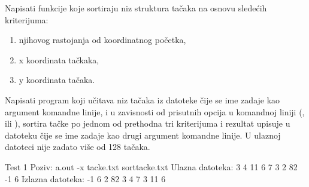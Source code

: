 \begin{Exercise}[label=507]
  Napisati funkcije koje sortiraju niz struktura tačaka na
  osnovu sledećih kriterijuma:
\begin{enumerate}
\item njihovog rastojanja od koordinatnog početka,
\item x koordinata tačkaka,
\item y koordinata tačaka.
\end{enumerate}
Napisati program koji učitava niz tačaka iz datoteke čije se ime
zadaje kao argument komandne linije, i u zavisnosti od prisutnih
opcija u komandnoj liniji (,  ili ),
sortira tačke po jednom od prethodna tri kriterijuma i rezultat
upisuje u datoteku čije se ime zadaje kao drugi argument komandne
linije. U ulaznoj datoteci nije zadato više od 128 tačaka.
  
\begin{miditest}
\begin{test}{Test 1}
Poziv:  a.out -x tacke.txt sorttacke.txt
Ulazna datoteka:   3 4
11 6
7 3
2 82
-1 6
Izlazna datoteka:  -1 6
2 82
3 4
7 3
11 6
\end{test}
\end{miditest}
  
\end{Exercise}

